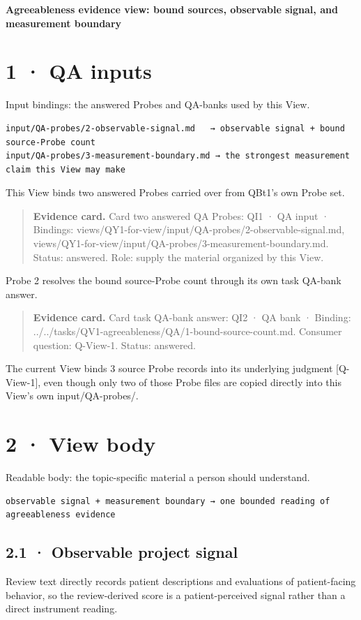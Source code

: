 \documentclass[11pt]{article}
\begin{document}
\begin{center}\LARGE\textbf{Agreeableness evidence view: bound sources, observable signal, and measurement boundary}\end{center}
\section*{1 · QA inputs}
Input bindings: the answered Probes and QA-banks used by this View.

\begin{Verbatim}[fontsize=\small]
input/QA-probes/2-observable-signal.md   → observable signal + bound source-Probe count
input/QA-probes/3-measurement-boundary.md → the strongest measurement claim this View may make
\end{Verbatim}
This View binds two answered Probes carried over from QBt1's own Probe set.

\begin{quote}\footnotesize\textbf{Evidence card.} Card two answered QA Probes: QI1 · QA input · Bindings: views/QY1-for-view/input/QA-probes/2-observable-signal.md, views/QY1-for-view/input/QA-probes/3-measurement-boundary.md. Status: answered. Role: supply the material organized by this View.\end{quote}
Probe 2 resolves the bound source-Probe count through its own task QA-bank answer.

\begin{quote}\footnotesize\textbf{Evidence card.} Card task QA-bank answer: QI2 · QA bank · Binding: ../../tasks/QV1-agreeableness/QA/1-bound-source-count.md. Consumer question: Q-View-1. Status: answered.\end{quote}
The current View binds 3 source Probe records into its underlying judgment [Q-View-1], even though only two of those Probe files are copied directly into this View's own input/QA-probes/.

\section*{2 · View body}
Readable body: the topic-specific material a person should understand.

\begin{Verbatim}[fontsize=\small]
observable signal + measurement boundary → one bounded reading of agreeableness evidence
\end{Verbatim}
\subsection*{2.1 · Observable project signal}
Review text directly records patient descriptions and evaluations of patient-facing behavior, so the review-derived score is a patient-perceived signal rather than a direct instrument reading.
\end{document}
